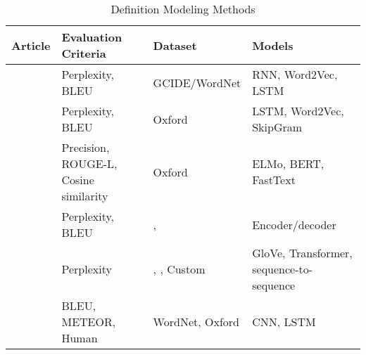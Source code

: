\begin{longtable}{|c|p{3.5cm}|p{3.5cm}|p{3.5cm}|}
    \caption{Definition Modeling Methods}                                                                                                                                                                                                                                \\
    \hline
    Article                              & Evaluation Criteria                                              & Dataset                                                                                                         & Models                                   \\
    \hline
    \cite{noraset_definition_2016}       & Perplexity, BLEU                                                 & GCIDE/WordNet                                                                                                   & RNN,  Word2Vec, LSTM                     \\
    \hline
    \cite{gadetsky_conditional_2018}     & Perplexity, BLEU                                                 & Oxford                                                                                                          & LSTM, Word2Vec, SkipGram                 \\
    \hline
    \cite{chang_what_2019}               & Precision,    ROUGE-L, Cosine similarity                         & Oxford                                                                                                          & ELMo, BERT, FastText                     \\
    \hline
    \cite{washio_bridging_2019}          & Perplexity, BLEU                                                 & \cite{noraset_definition_2016}, \cite{gadetsky_conditional_2018}                                                & Encoder/decoder                          \\
    \hline
    \cite{mickus_mark_2019}              & Perplexity                                                       & \cite{noraset_definition_2016}, \cite{gadetsky_conditional_2018}, Custom                                        & GloVe, Transformer, sequence-to-sequence \\
    \hline
    \cite{li_explicit_2020}              & BLEU, METEOR, Human                                              & WordNet, Oxford                                                                                                 & CNN, LSTM                                \\

\end{longtable}
